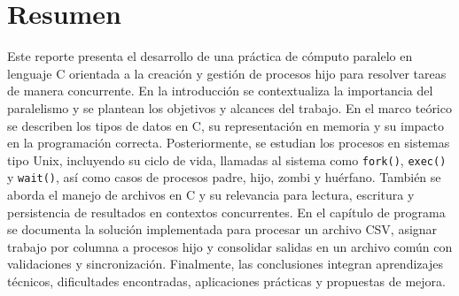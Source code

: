 
\chapter*{Resumen}

Este reporte presenta el desarrollo de una práctica de cómputo paralelo en lenguaje C orientada a la creación y gestión de procesos hijo para resolver tareas de manera concurrente. En la introducción se contextualiza la importancia del paralelismo y se plantean los objetivos y alcances del trabajo. En el marco teórico se describen los tipos de datos en C, su representación en memoria y su impacto en la programación correcta. Posteriormente, se estudian los procesos en sistemas tipo Unix, incluyendo su ciclo de vida, llamadas al sistema como \texttt{fork()}, \texttt{exec()} y \texttt{wait()}, así como casos de procesos padre, hijo, zombi y huérfano. También se aborda el manejo de archivos en C y su relevancia para lectura, escritura y persistencia de resultados en contextos concurrentes. En el capítulo de programa se documenta la solución implementada para procesar un archivo CSV, asignar trabajo por columna a procesos hijo y consolidar salidas en un archivo común con validaciones y sincronización. Finalmente, las conclusiones integran aprendizajes técnicos, dificultades encontradas, aplicaciones prácticas y propuestas de mejora.